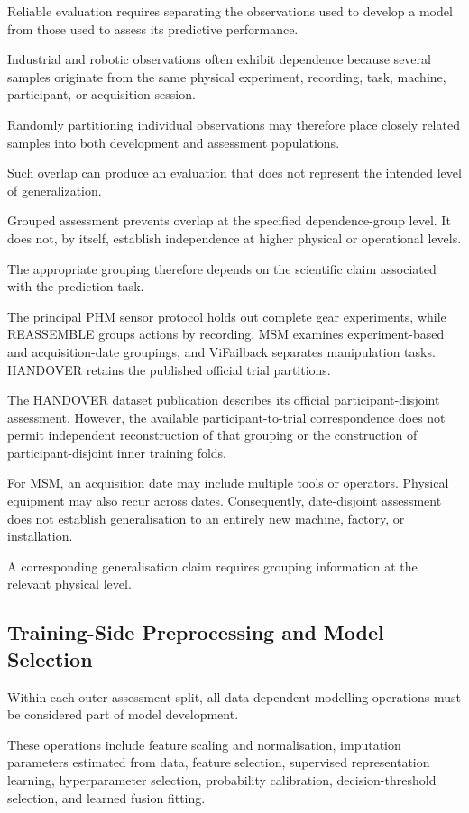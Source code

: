 Reliable evaluation requires separating the observations used to develop a model from those used to assess its predictive performance.

Industrial and robotic observations often exhibit dependence because several samples originate from the same physical experiment, recording, task, machine, participant, or acquisition session.

Randomly partitioning individual observations may therefore place closely related samples into both development and assessment populations.

Such overlap can produce an evaluation that does not represent the intended level of generalization.

Grouped assessment prevents overlap at the specified dependence-group level. It does not, by itself, establish independence at higher physical or operational levels.

The appropriate grouping therefore depends on the scientific claim associated with the prediction task.

The principal PHM sensor protocol holds out complete gear experiments, while REASSEMBLE groups actions by recording. MSM examines experiment-based and acquisition-date groupings, and ViFailback separates manipulation tasks. HANDOVER retains the published official trial partitions.

The HANDOVER dataset publication describes its official participant-disjoint assessment. However, the available participant-to-trial correspondence does not permit independent reconstruction of that grouping or the construction of participant-disjoint inner training folds.

For MSM, an acquisition date may include multiple tools or operators. Physical equipment may also recur across dates. Consequently, date-disjoint assessment does not establish generalisation to an entirely new machine, factory, or installation.

A corresponding generalisation claim requires grouping information at the relevant physical level.

\subsection{Training-Side Preprocessing and Model Selection}

Within each outer assessment split, all data-dependent modelling operations must be considered part of model development.

These operations include feature scaling and normalisation, imputation parameters estimated from data, feature selection, supervised representation learning, hyperparameter selection, probability calibration, decision-threshold selection, and learned fusion fitting.

